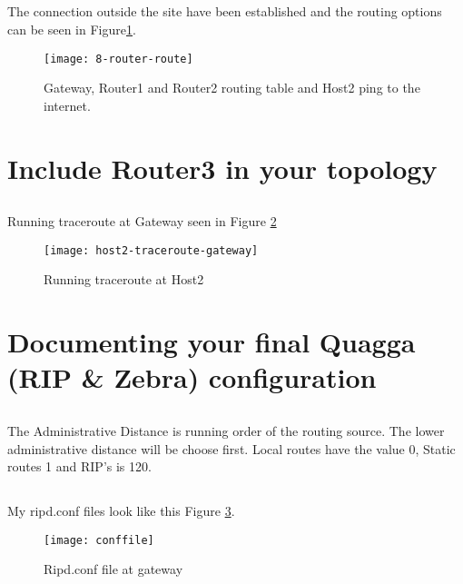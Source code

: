 \documentclass{article}
\begin{document}
\subsection{} The connection outside the site have been established and the routing options can be seen in Figure{\ref{fig:router_route}}.

\begin{figure}[h]
    \texttt{[image: 8-router-route]}
    \label{fig:router_route}
    \caption{Gateway, Router1 and Router2 routing table and Host2 ping to the internet.}
\end{figure}



\section{Include Router3 in your topology}

\subsection{} 

\subsection{} 
Running traceroute at Gateway seen in Figure \ref{fig:host2-traceroute}
\begin{figure}[!h]
    \texttt{[image: host2-traceroute-gateway]}
    \label{fig:host2-traceroute}
    \caption{Running traceroute at Host2}
\end{figure}

\subsection{} 

\section{Documenting your final Quagga (RIP \& Zebra) configuration}

\subsection{} 
The Administrative Distance is running order of the routing source. The lower administrative distance will be choose first. Local routes have the value 0, Static routes 1 and RIP's is 120.
\subsection{}

My ripd.conf files look like this Figure \ref{fig:conffile}.

\begin{figure}[!h]
    \texttt{[image: conffile]}
    \label{fig:conffile}
    \caption{Ripd.conf file at gateway}
\end{figure}
\end{document}
